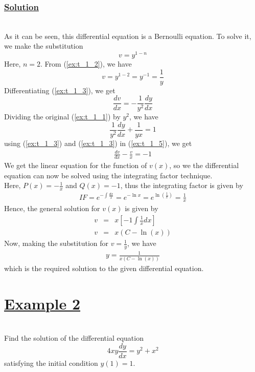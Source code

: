 \documentclass[11pt]{report}
\newcommand{\ubt}[1]{\textbf{\underline{#1}}}
\newcommand{\sps}{\\[0.2cm]}
\newcommand{\spn}[1]{\\[#1cm]}
\newcommand{\refn}[1]{(\ref{#1})}
\newcommand{\example}[1]{\section*{\ubt{Example #1}}{~}\spn{-1}}
\newcommand{\solution}{\subsubsection{\ubt{Solution}}{~}\spn{-1}}
\begin{document}
	\solution
	As it can be seen, this differential equation is a Bernoulli equation. To solve it, we make the substitution
	\begin{equation}
		v = y^{1-n}\tag{2}\label{ex:t_1_2}
	\end{equation}
	Here, $n=2$. From \refn{ex:t_1_2}, we have
	\begin{equation}
		v = y^{1-2} = y^{-1}= \frac{1}{y}\tag{3}\label{ex:t_1_3}
	\end{equation}
	Differentiating \refn{ex:t_1_3}, we get
	\begin{equation}
		\frac{dv}{dx} = -\frac{1}{y^2}\frac{dy}{dx}\tag{4}\label{ex:t_1_4}
	\end{equation}
	Dividing the original \refn{ex:t_1_1} by $y^2$, we have
	\begin{equation}
		\frac{1}{y^2}\frac{dy}{dx} + \frac{1}{yx} = 1\tag{5}\label{ex:t_1_5}
	\end{equation}
	using \refn{ex:t_1_3} and \refn{ex:t_1_3} in \refn{ex:t_1_5}, we get
	\begin{gather*}
		\frac{dv}{dx} - \frac{v}{x} = -1
	\end{gather*}
	We get the linear equation for the function of $v(x)$, so we the differential equation can now be solved using the integrating factor technique.\sps
	Here, $P(x) = -\frac{1}{x}$ and $Q(x)=-1$, thus the integrating factor is given by
	\begin{eqnarray*}
		IF = e^{-\int\frac{dx}{x}} = e^{-\ln x} = e^{\ln(\frac{1}{x})} = \frac{1}{x}
	\end{eqnarray*}
	Hence, the general solution for $v(x)$ is given by
	\begin{eqnarray*}
		v &=& x\left[-1\int\frac{1}{x}dx\right]\sps
		v &=& x(C-\ln(x))
	\end{eqnarray*}
	Now, making the substitution for $v = \frac{1}{y}$, we have
	\begin{eqnarray*}
		y = \frac{1}{x(C-\ln(x))}
	\end{eqnarray*}
	which is the required solution to the given differential equation.

	\example{2}
	Find the solution of the differential equation
	\begin{equation}
		4xy\frac{dy}{dx} = y^2 + x^2\tag{1}\label{ex:t_2_1}
	\end{equation}
	satisfying the initial condition $y(1)=1$.
\end{document}
